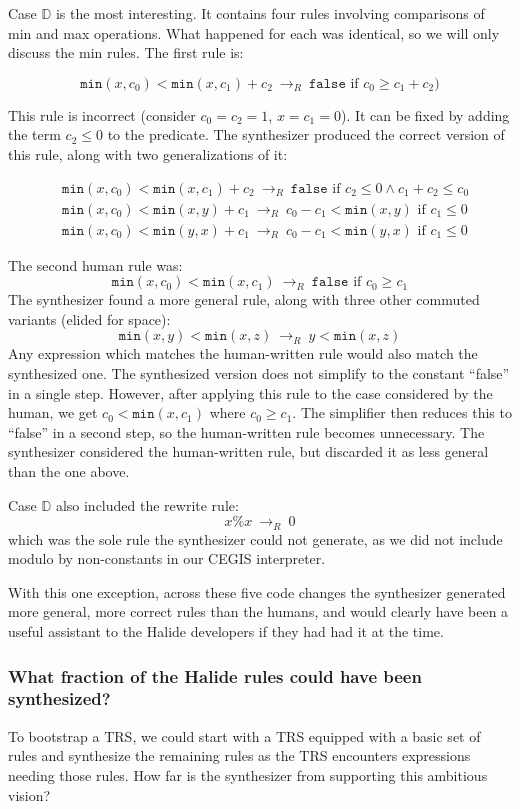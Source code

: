 \documentclass[acmsmall,review]{acmart}\settopmatter{printfolios=true,printccs=false,printacmref=false}
\newcommand{\hmin}[0]{\texttt{min}}
\newcommand{\rewrites}[0]{\:\rightarrow_{R}\:}
\newcommand{\pred}[0]{\textrm{ if }}
\newcommand{\hfalse}[0]{\texttt{false}}
\begin{document}
Case $\mathbb{D}$ is the most interesting. It contains four rules involving comparisons of min and max operations. What happened for each was identical, so we will only discuss the min rules. The first rule is:

\[
\hmin(x, c_0) < \hmin(x, c_1) + c_2 \rewrites \hfalse \pred c_0 \geq c_1 + c_2)
\]

This rule is incorrect (consider $c_0 = c_2 = 1$, $x = c_1 = 0$). It can be fixed by adding the term $c_2 \leq 0$ to the predicate. The synthesizer produced the correct version of this rule, along with two generalizations of it:

\begin{align*}
& \hmin(x, c_0) < \hmin(x, c_1) + c_2 \rewrites  \hfalse \pred c_2 \leq 0 \wedge c_1 + c_2 \leq c_0 \\
& \hmin(x, c_0) < \hmin(x, y) + c_1 \rewrites c_0 - c_1 < \hmin(x, y) \pred c_1 \leq 0 \\
& \hmin(x, c_0) < \hmin(y, x) + c_1 \rewrites c_0 - c_1 < \hmin(y, x) \pred c_1 \leq 0
\end{align*}

The second human rule was:
\[
\hmin(x, c_0) < \hmin(x, c_1) \rewrites \hfalse \pred c_0 \geq c_1
\]
The synthesizer found a more general rule, along with three other commuted variants (elided for space):
\[
\hmin(x, y) < \hmin(x, z) \rewrites y < \hmin(x, z)
\]
Any expression which matches the human-written rule would also match the synthesized one. The synthesized version does not simplify to the constant “false” in a single step. However, after applying this rule to the case considered by the human, we get $c_0 < \hmin(x, c_1)$ where $c_0 \geq c_1$. The simplifier then reduces this to “false” in a second step, so the human-written rule becomes unnecessary. The synthesizer considered the human-written rule, but discarded it as less general than the one above.

Case $\mathbb{D}$ also included the rewrite rule: 
\[
x \% x \rewrites 0
\]
which was the sole rule the synthesizer could not generate, as we did not include modulo by non-constants in our CEGIS interpreter.

With this one exception, across these five code changes the synthesizer generated more general, more correct rules than the humans, and would clearly have been a useful assistant to the Halide developers if they had had it at the time.


\subsubsection{What fraction of the Halide rules could have been synthesized?}
\label{sub:replacementexperiment}
To bootstrap a TRS, we could start with a TRS equipped with a basic set of rules and synthesize the remaining rules as the TRS encounters expressions needing those rules.  How far is the synthesizer from supporting this ambitious vision?
\end{document}
